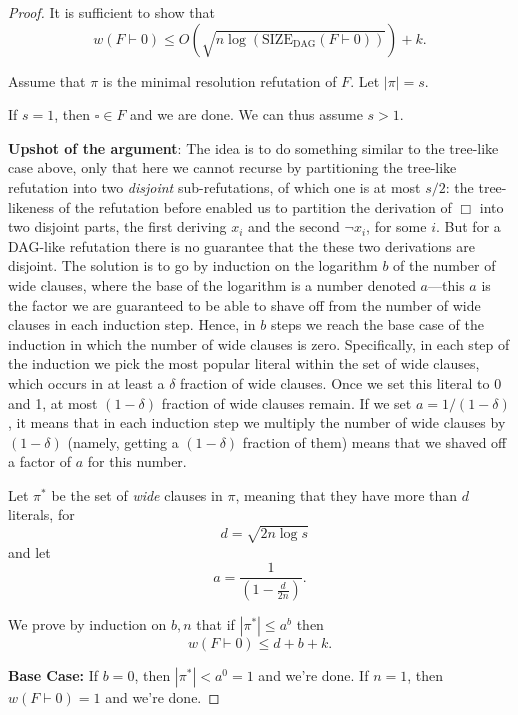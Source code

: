 \begin{proof}
It is sufficient to show that
\[
w(F \vdash 0) \leq O\left(\sqrt{n \log(\text{SIZE}_{\text{DAG}}(F \vdash 0))}\right) + k.
\]


 Assume that $\pi$ is the minimal resolution refutation of $F$. Let $|\pi| = s$.

If $s = 1$, then $\square \in F$ and we are  done. We can thus assume  $s > 1$.
\bigskip

\begin{tcolorbox}[colframe=white, colback=red!5, boxrule=0mm, sharp corners,breakable]
\noindent \textbf{Upshot of the argument}:
The idea is to do something similar to the tree-like case above, only that here we cannot recurse by partitioning the tree-like refutation into two \emph{disjoint} sub-refutations, of which one is at most $s/2$: the tree-likeness of the refutation before enabled us to partition the derivation of $\Box$ into two disjoint parts, the first deriving $x_i$ and the second $\neg x_i$, for some $i$. But for a DAG-like refutation there is no guarantee that the these two derivations are disjoint. The solution is to go by induction on the logarithm $b$ of the number of wide clauses, where the base of the logarithm is a number denoted $a$---this $a$ is the factor we are guaranteed to be able to shave off from the number of wide clauses in each induction step. Hence, in $b$ steps we reach the base case of the induction in which the number of wide clauses is zero. Specifically, in each step of the induction we pick the most popular literal within the set of wide clauses, which occurs in at least a $\delta$ fraction of wide clauses. Once we set this literal to 0 and 1, at most $(1-\delta)$ fraction of wide clauses remain. If we set $a=1/(1-\delta)$, it means that in each induction step we multiply the number of wide clauses by $(1-\delta)$ (namely, getting a $(1-\delta)$ fraction of them) means that we shaved off a factor of $a$ for this number. 
\end{tcolorbox}
\bigskip

Let $\pi^*$ be the set of \textit{wide} clauses in $\pi$, meaning that they have more than $d$ literals, for  
$$
    \text{ } d = \sqrt{2n \log s} 
$$
  and let 
    \[
    a = \frac{1}{\left(1 - \frac{d}{2n} \right)}.
    \]
     
We prove by induction on $b, n$ that if $|\pi^*| \leq a^b$ then 
    \[
    w(F \vdash 0) \leq d + b + k.
    \]
    
    \textbf{Base Case:} If $b = 0$, then $|\pi^*| < a^0 = 1$ and we're done. If $n = 1$, then $w(F \vdash 0) = 1$ and we're done.


\end{proof}
